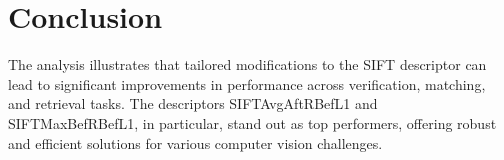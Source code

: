 \section*{Conclusion}

The analysis illustrates that tailored modifications to the SIFT descriptor can lead to significant improvements in performance across verification, matching, and retrieval tasks. The descriptors SIFTAvgAftRBefL1 and SIFTMaxBefRBefL1, in particular, stand out as top performers, offering robust and efficient solutions for various computer vision challenges.


